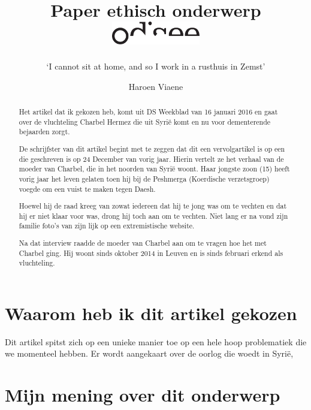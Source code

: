\documentclass[12pt, a4paper]{paper}
\title{
\vspace{-2cm}
Paper ethisch onderwerp\\
\vspace{-1cm}
\hfill\includegraphics[height=1cm]{logo.pdf}}
\subtitle{`I cannot sit at home, and so I work in a rusthuis in Zemst'
\vspace{-.5cm}}
\author{
\vspace{-1cm}
\begin{large}
  Haroen Viaene
\end{large}
\vspace{-1cm}
}
\begin{document}
\maketitle

\begin{abstract}

Het artikel dat ik gekozen heb, komt uit DS Weekblad van 16 januari 2016 en gaat over de vluchteling Charbel Hermez die uit Syrië komt en nu voor dementerende bejaarden zorgt.

De schrijfster van dit artikel begint met te zeggen dat dit een vervolgartikel is op een die geschreven is op 24 December van vorig jaar. Hierin vertelt ze het verhaal van de moeder van Charbel, die in het noorden van Syrië woont. Haar jongste zoon (15) heeft vorig jaar het leven gelaten toen hij bij de Peshmerga (Koerdische verzetsgroep) voegde om een vuist te maken tegen Daesh.

Hoewel hij de raad kreeg van zowat iedereen dat hij te jong was om te vechten en dat hij er niet klaar voor was, drong hij toch aan om te vechten. Niet lang er na vond zijn familie foto's van zijn lijk op een extremistische website.

Na dat interview raadde de moeder van Charbel aan om te vragen hoe het met Charbel ging. Hij woont sinds oktober 2014 in Leuven en is sinds februari erkend als vluchteling.


\end{abstract}

\section{Waarom heb ik dit artikel gekozen}

Dit artikel spitst zich op een unieke manier toe op een hele hoop problematiek die we momenteel hebben. Er wordt aangekaart over de oorlog die woedt in Syrië,


\section{Mijn mening over dit onderwerp}



\end{document}
